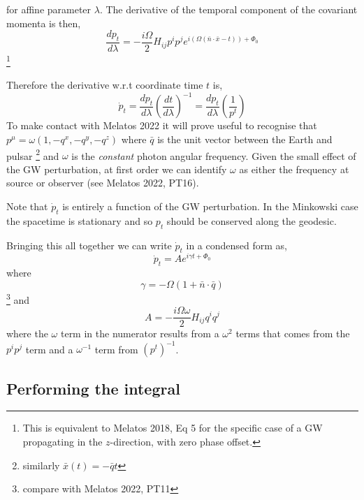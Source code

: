 \documentclass[fleqn,usenatbib,useAMS]{mnras}
\begin{document}
\noindent for affine parameter $\lambda$. The derivative of the temporal component of the covariant momenta is then,
\begin{equation}
	\frac{d p_{t}}{d \lambda} = -\frac{i\Omega}{2} H_{ij}p^i p^j  e^{i(\Omega(\bar{n}\cdot \bar{x} - t))+\Phi_0}
\end{equation}
\footnote{This is equivalent to Melatos 2018, Eq 5 for the specific case of a GW propagating in the $z$-direction, with zero phase offset.}


\noindent Therefore the derivative w.r.t coordinate time $t$ is,
\begin{equation}
	\dot{p}_t = \frac{d p_{t}}{d \lambda} \left(\frac{dt}{d\lambda}\right)^{-1} = \frac{d p_{t}}{d \lambda} \left(\frac{1}{p^t}\right)
\end{equation}
\noindent To make contact with Melatos 2022 it will prove useful to recognise that $p^{\mu} = \omega(1,-q^x,-q^y,-q^z)$ where $\bar{q}$ is the unit vector between the Earth and pulsar \footnote{similarly $\bar{x}(t) = -\bar{q}t$} and $\omega$ is the \textit{constant} photon angular frequency. Given the small effect of the GW perturbation, at first order we can identify $\omega$ as either the frequency at source or observer (see Melatos 2022, PT16). \newline 



\noindent Note that $\dot{p}_t$ is entirely a function of the GW perturbation. In the Minkowski case the spacetime is stationary and so $p_t$ should be conserved along the geodesic.  \newline 


\noindent Bringing this all together we can write $\dot{p}_t$ in a condensed form as,
\begin{equation}
	\dot{p}_t = A e^{i \gamma t + \Phi_0}
\end{equation}
where 
\begin{equation}
	\gamma = -\Omega (1 + \bar{n}\cdot \bar{q}) 
\end{equation}
\footnote{compare with Melatos 2022, PT11}
\noindent and
\begin{equation}
	A = -\frac{i\Omega \omega}{2} H_{ij}q^i q^j 
\end{equation}
where the $\omega$ term in the numerator results from a $\omega^2$ terms that comes from the $p^i p^j$ term and a $\omega^{-1}$ term from $(p^t)^{-1}$.
\subsection{Performing the integral}
\end{document}
